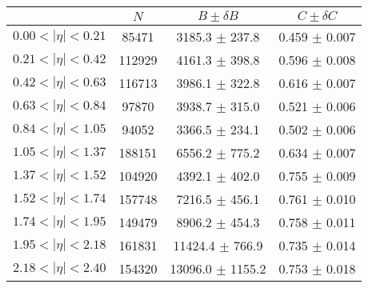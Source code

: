 \begin{tabular}{lccc}
\hline
    &   $N$   & $B \pm \delta B$  &  $C \pm \delta C$ \\
\hline
$0.00 < |\eta| <0.21$          & 85471      & 3185.3     $\pm$ 237.8 & 0.459      $\pm$ 0.007 \\
$0.21 < |\eta| <0.42$          & 112929     & 4161.3     $\pm$ 398.8 & 0.596      $\pm$ 0.008 \\
$0.42 < |\eta| <0.63$          & 116713     & 3986.1     $\pm$ 322.8 & 0.616      $\pm$ 0.007 \\
$0.63 < |\eta| <0.84$          & 97870      & 3938.7     $\pm$ 315.0 & 0.521      $\pm$ 0.006 \\
$0.84 < |\eta| <1.05$          & 94052      & 3366.5     $\pm$ 234.1 & 0.502      $\pm$ 0.006 \\
$1.05 < |\eta| <1.37$          & 188151     & 6556.2     $\pm$ 775.2 & 0.634      $\pm$ 0.007 \\
$1.37 < |\eta| <1.52$          & 104920     & 4392.1     $\pm$ 402.0 & 0.755      $\pm$ 0.009 \\
$1.52 < |\eta| <1.74$          & 157748     & 7216.5     $\pm$ 456.1 & 0.761      $\pm$ 0.010 \\
$1.74 < |\eta| <1.95$          & 149479     & 8906.2     $\pm$ 454.3 & 0.758      $\pm$ 0.011 \\
$1.95 < |\eta| <2.18$          & 161831     & 11424.4    $\pm$ 766.9 & 0.735      $\pm$ 0.014 \\
$2.18 < |\eta| <2.40$          & 154320     & 13096.0    $\pm$ 1155.2 & 0.753      $\pm$ 0.018 \\
\hline
\end{tabular}
